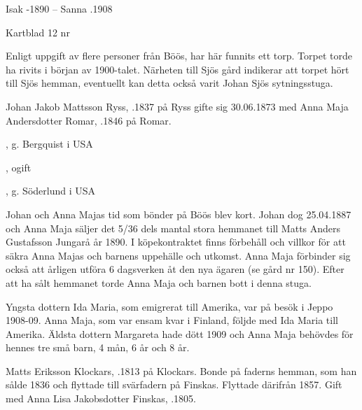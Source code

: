 Isak -1890  --  Sanna .1908


Kartblad 12   nr 

Enligt uppgift av flere personer från Böös, har här funnits ett torp. Torpet torde ha rivits i början av 1900-talet. Närheten till Sjös gård indikerar att torpet hört till Sjös hemman, eventuellt kan detta också varit Johan Sjös sytningsstuga.

Johan Jakob Mattsson Ryss, .1837 på Ryss gifte sig 30.06.1873 med Anna Maja Andersdotter Romar, .1846 på Romar.
\begin{jhchildren}
  \item {}
  \item {}, g. Bergquist i USA
  \item {}, ogift
  \item {}
  \item {}
  \item {}, g. Söderlund i USA
\end{jhchildren}
Johan och Anna Majas tid som bönder på Böös blev kort. Johan dog 25.04.1887 och Anna Maja säljer det 5/36 dels mantal stora hemmanet till Matts Anders Gustafsson Jungarå år 1890. I köpekontraktet finns förbehåll och villkor för att säkra Anna Majas och barnens uppehälle och utkomst. Anna Maja förbinder sig också att årligen utföra 6 dagsverken åt den nya ägaren (se gård nr 150). Efter att ha sålt hemmanet torde Anna Maja och barnen bott i denna stuga.

Yngsta dottern Ida Maria, som emigrerat till Amerika, var på besök i Jeppo 1908-09. Anna Maja, som var ensam kvar i Finland, följde med 	Ida Maria till Amerika. Äldsta dottern Margareta hade dött 1909 och Anna Maja behövdes för hennes tre små barn, 4 mån, 6 år och 8 år.


Matts Eriksson Klockars, .1813 på Klockars. Bonde på faderns hemman, som han sålde 1836 och flyttade till svärfadern på Finskas. Flyttade därifrån 1857. Gift med Anna Lisa Jakobsdotter Finskas, .1805.
\begin{jhchildren}
  \item {}
  \item {}
  \item {}
\end{jhchildren}


